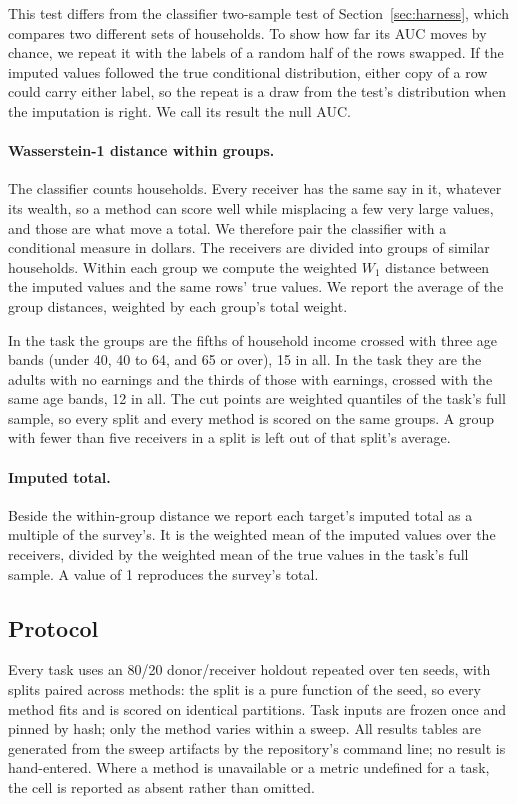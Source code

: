 This test differs from the classifier two-sample test of
Section~\ref{sec:harness}, which compares two different sets of households.
To show how far its AUC moves by chance, we repeat it with the labels of a
random half of the rows swapped. If the imputed values followed the true
conditional distribution, either copy of a row could carry either label, so
the repeat is a draw from the test's distribution when the imputation is
right. We call its result the null AUC.

\paragraph{Wasserstein-1 distance within groups.} The classifier counts
households. Every receiver has the same say in it, whatever its wealth, so a
method can score well while misplacing a few very large values, and those
are what move a total. We therefore pair the classifier with a conditional
measure in dollars. The receivers are divided into groups of similar
households. Within each group we compute the weighted $W_1$ distance between
the imputed values and the same rows' true values. We report the average of
the group distances, weighted by each group's total weight.

In the \scf{} task the groups are the fifths of household income crossed
with three age bands (under 40, 40 to 64, and 65 or over), 15 in all. In the
\cps{} task they are the adults with no earnings and the thirds of those with
earnings, crossed with the same age bands, 12 in all. The cut points are
weighted quantiles of the task's full sample, so every split and every
method is scored on the same groups. A group with fewer than five receivers
in a split is left out of that split's average.

\paragraph{Imputed total.} Beside the within-group distance we report each
target's imputed total as a multiple of the survey's. It is the weighted
mean of the imputed values over the receivers, divided by the weighted mean
of the true values in the task's full sample. A value of 1 reproduces the
survey's total.

\subsection{Protocol}
\label{sec:protocol}

Every task uses an 80/20 donor/receiver holdout repeated over ten seeds, with
splits paired across methods: the split is a pure function of the seed, so
every method fits and is scored on identical partitions. Task inputs are
frozen once and pinned by hash; only the method varies within a sweep. All
results tables are generated from the sweep artifacts by the repository's
command line; no result is hand-entered. Where a method is unavailable or a
metric undefined for a task, the cell is reported as absent rather than
omitted.

